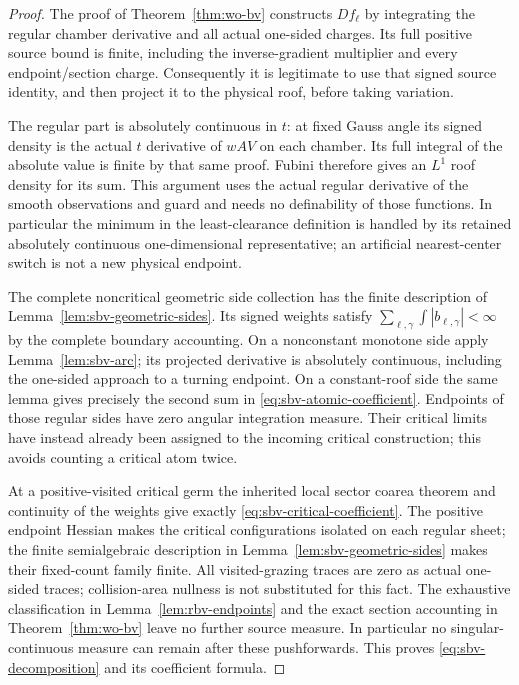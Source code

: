 \begin{proof}
The proof of Theorem~\ref{thm:wo-bv} constructs $Df_\ell$ by
integrating the regular chamber derivative and all actual one-sided
charges.  Its full positive source bound is finite, including the
inverse-gradient multiplier and every endpoint/section charge.
Consequently it is legitimate to use that signed source identity,
and then project it to the physical roof, before taking variation.

The regular part is absolutely continuous in $t$: at fixed Gauss
angle its signed density is the actual $t$ derivative of $wAV$ on
each chamber.  Its full integral of the absolute value is finite
by that same proof.  Fubini therefore gives an $L^1$ roof density
for its sum.  This argument uses the actual regular derivative of
the smooth observations and guard and needs no definability of
those functions.  In particular the minimum in the least-clearance
definition is handled by its retained absolutely continuous
one-dimensional representative; an artificial nearest-center
switch is not a new physical endpoint.

The complete noncritical geometric side collection has the finite
description of Lemma~\ref{lem:sbv-geometric-sides}.  Its signed
weights satisfy
$\sum_{\ell,\gamma}\int|b_{\ell,\gamma}|<\infty$ by the complete
boundary accounting.  On a nonconstant monotone side apply
Lemma~\ref{lem:sbv-arc}; its projected derivative is absolutely
continuous, including the one-sided approach to a turning endpoint.
On a constant-roof side the same lemma gives precisely the second
sum in \eqref{eq:sbv-atomic-coefficient}.  Endpoints of those
regular sides have zero angular integration measure.  Their
critical limits have instead already been assigned to the
incoming critical construction; this avoids counting a critical
atom twice.

At a positive-visited critical germ the inherited local sector
coarea theorem and continuity of the weights give exactly
\eqref{eq:sbv-critical-coefficient}.  The positive endpoint Hessian makes the critical configurations
isolated on each regular sheet; the finite semialgebraic
description in Lemma~\ref{lem:sbv-geometric-sides} makes their
fixed-count family finite.
All visited-grazing traces are zero as actual one-sided traces;
collision-area nullness is not substituted for this fact.  The
exhaustive classification in Lemma~\ref{lem:rbv-endpoints} and
the exact section accounting in Theorem~\ref{thm:wo-bv} leave
no further source measure.  In particular no singular-continuous
measure can remain after these pushforwards.  This proves
\eqref{eq:sbv-decomposition} and its coefficient formula.


\end{proof}
